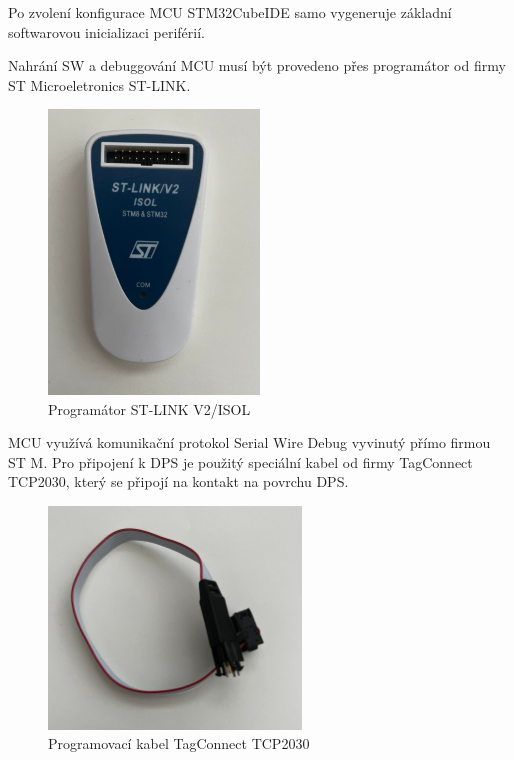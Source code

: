 Po zvolení konfigurace MCU STM32CubeIDE samo vygeneruje základní softwarovou inicializaci periférií.
\par
Nahrání SW a debuggování MCU musí být provedeno přes programátor od firmy ST Microeletronics ST-LINK.
\begin{figure}[H]
    \caption{Programátor ST-LINK V2/ISOL}
    \includegraphics[width=0.5\textwidth]{pictures/stlink.jpg}
\end{figure}
MCU využívá komunikační protokol Serial Wire Debug vyvinutý přímo firmou ST M. Pro připojení k DPS je použitý speciální kabel od firmy TagConnect TCP2030, který se připojí na kontakt na povrchu DPS.
\begin{figure}[H]
    \caption{Programovací kabel TagConnect TCP2030}
    \includegraphics[width=0.6\textwidth]{pictures/tcp2030.jpg}
\end{figure}
